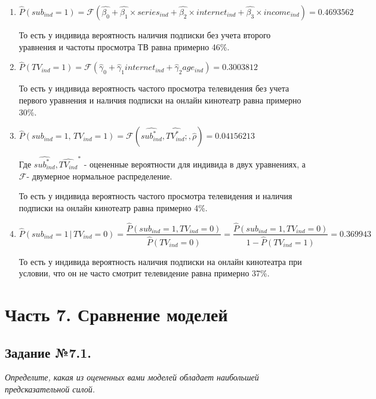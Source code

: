 \documentclass[a4paper,12pt]{article}
\begin{document}
	\begin{enumerate}
		\item $\widehat{P} (sub_{ind}=1)=  \mathcal{F} (\hat{\beta_0} + \hat{\beta_1}\times series_{ind}+ \hat{\beta_2} \times internet_{ind} +\hat{\beta_3}\times income_{ind}) = 0.4693562$
		
		То есть у индивида вероятность наличия подписки без учета второго уравнения и частоты просмотра ТВ равна примерно 46\%.
		
		\item $\widehat{P} (TV_{ind}=1)= \mathcal{F} (\hat\gamma_0 + \hat\gamma_1 internet_{ind}+ \hat\gamma_2 age_{ind}) = 0.3003812$
		
		То есть у индивида вероятность частого просмотра телевидения без учета первого уравнения и наличия подписки на онлайн кинотеатр равна примерно 30\%.
		
		\item $\widehat{P} (sub_{ind}=1, \, TV_{ind}=1) = \mathcal{F} (\widehat{sub_{ind}^*}, \widehat{TV_{ind}^*}; , \hat\rho) = 0.04156213$
	
		Где $\widehat{sub_{ind}^*}, \widehat{TV_{ind}}^*$ - оцененные вероятности для индивида в двух уравнениях, а $\mathcal{F} $- двумерное нормальное распределение.
		
		То есть у индивида вероятность частого просмотра телевидения и наличия подписки на онлайн кинотеатр равна примерно 4\%.
			
		\item $\widehat{P} (sub_{ind}=1 \,|\, TV_{ind}=0) = \dfrac{\widehat{P} (sub_{ind}=1, TV_{ind}=0)}{\widehat{P} (TV_{ind}=0)} = \dfrac{\widehat{P}(sub_{ind}=1, TV_{ind}=0)}{1-\widehat{P} (TV_{ind}=1)} = 0.369943$
		
		То есть у индивида вероятность наличия подписки на онлайн кинотеатра при условии, что он не часто смотрит телевидение равна примерно 37\%.
		
	\end{enumerate}

	\newpage
	\section{Часть 7. Сравнение моделей}
	
	\subsection{Задание №7.1.}
	\textit{
	Определите, какая из оцененных вами моделей обладает наибольшей предсказательной силой. }
	
\end{document}
